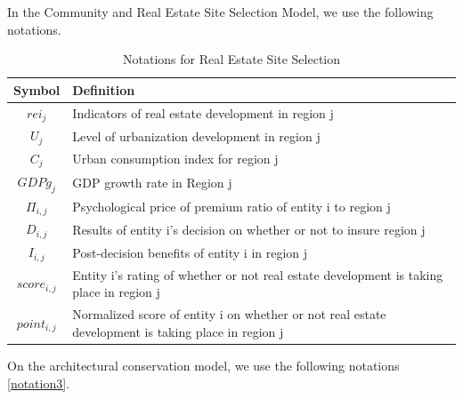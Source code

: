 \documentclass[12pt]{article}  %
\begin{document}
In the Community and Real Estate Site Selection Model, we use the following notations.

\begin{longtable}{ c p{28em} }
\caption{Notations for Real Estate Site Selection}
\label{tb:longtable}\\
\toprule
\multicolumn{1}{m{3cm}}{\centering Symbol}
	&\multicolumn{1}{m{11cm}}{\centering Definition}\\
\midrule
$rei_j$ & Indicators of real estate development in region j \\
$U_j$ & Level of urbanization development in region j \\
$C_j$ & Urban consumption index for region j \\
$GDPg_j$ & GDP growth rate in Region j \\
$\Pi_{i,j}$ & Psychological price of premium ratio of entity i to region j \\
$D_{i,j}$ & Results of entity i's decision on whether or not to insure region j \\
$I_{i,j}$ & Post-decision benefits of entity i in region j \\
$score_{i,j}$ & Entity i's rating of whether or not real estate development is taking place in region j \\
$point_{i,j}$ & Normalized score of entity i on whether or not real estate development is taking place in region j \\

\bottomrule
\end{longtable}


On the architectural conservation model, we use the following notations \ref{notation3}.
\end{document}
